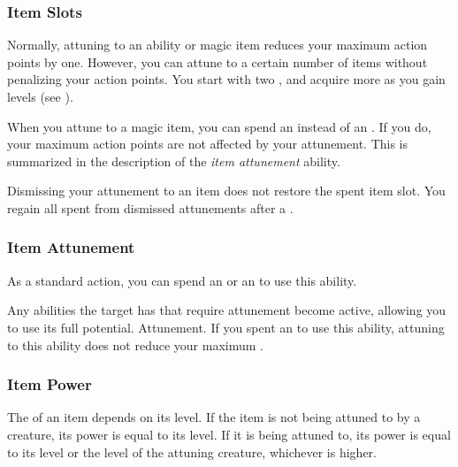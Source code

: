         \subsubsection{Item Slots}
            Normally, attuning to an ability or magic item reduces your maximum action points by one.
            However, you can attune to a certain number of items without penalizing your action points.
            You start with two , and acquire more as you gain levels (see ).

            When you attune to a magic item, you can spend an  instead of an .
            If you do, your maximum action points are not affected by your attunement.
            This is summarized in the description of the \textit{item attunement} ability.

            Dismissing your attunement to an item does not restore the spent item slot.
            You regain all spent  from dismissed attunements after a .

        \subsubsection{Item Attunement}
            As a standard action, you can spend an  or an  to use this ability.
            \begin{ability}
                \begin{spelltargetinginfo}
                \end{spelltargetinginfo}
                \begin{spelleffects}
                    \spelleffect Any abilities the target has that require attunement become active, allowing you to use its full potential.
                    \spelldur Attunement. If you spent an  to use this ability, attuning to this ability does not reduce your maximum .
                \end{spelleffects}
            \end{ability}

    \subsubsection{Item Power}
        The  of an item depends on its level.
        If the item is not being attuned to by a creature, its power is equal to its level.
        If it is being attuned to, its power is equal to its level or the level of the attuning creature, whichever is higher.

